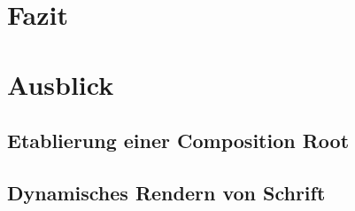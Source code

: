\documentclass[12pt,a4paper,listof=toc,parskip=half,numbers=noenddot,abstract=true]{scrartcl}
\begin{document}
% 
% 
% 
% 
% 
% 

\pagebreak
\section{Fazit}
\pagebreak
\section{Ausblick}
\subsection{Etablierung einer Composition Root}\label{sec:EtablierungEinerKompositionroot}

\subsection{Dynamisches Rendern von Schrift}
\end{document}
